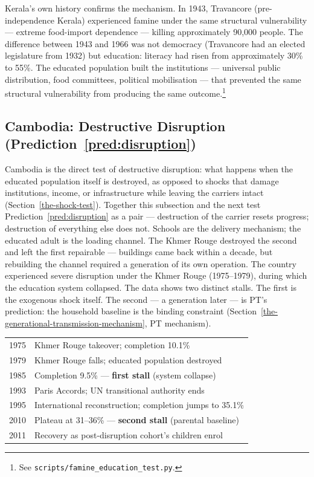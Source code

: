 \documentclass[12pt,letterpaper]{article}
\begin{document}
Kerala's own history confirms the mechanism. In 1943, Travancore (pre-independence Kerala) experienced famine under the same structural vulnerability --- extreme food-import dependence --- killing approximately 90,000 people. The difference between 1943 and 1966 was not democracy (Travancore had an elected legislature from 1932) but education: literacy had risen from approximately 30\% to 55\%. The educated population built the institutions --- universal public distribution, food committees, political mobilisation --- that prevented the same structural vulnerability from producing the same outcome.\footnote{See \texttt{scripts/famine\_education\_test.py}.}

\subsection{Cambodia: Destructive Disruption (Prediction~\ref{pred:disruption})}\label{cambodia-the-pt-shadow}

Cambodia is the direct test of destructive disruption: what happens
when the educated population itself is destroyed, as opposed to
shocks that damage institutions, income, or infrastructure while
leaving the carriers intact (Section~\ref{the-shock-test}). Together
this subsection and the next test
Prediction~\ref{pred:disruption} as a pair --- destruction of the
carrier resets progress; destruction of everything else does not. Schools are the
delivery mechanism; the educated adult is the loading channel. The
Khmer Rouge destroyed the second and left the first repairable ---
buildings came back within a decade, but rebuilding the channel
required a generation of its own operation. The country experienced
severe disruption under the Khmer Rouge (1975--1979), during which
the education system collapsed. The
data shows two distinct stalls. The first is the exogenous shock itself.
The second --- a generation later --- is PT's prediction: the
household baseline is the binding constraint (Section~\ref{the-generational-transmission-mechanism}, PT mechanism).

\begin{center}
\small
\begin{tabular}{@{}ll@{}}
\toprule
1975 & Khmer Rouge takeover; completion 10.1\% \\
1979 & Khmer Rouge falls; educated population destroyed \\
1985 & Completion 9.5\% --- \textbf{first stall} (system collapse) \\
1993 & Paris Accords; UN transitional authority ends \\
1995 & International reconstruction; completion jumps to 35.1\% \\
2010 & Plateau at 31--36\% --- \textbf{second stall} (parental baseline) \\
2011 & Recovery as post-disruption cohort's children enrol \\
\bottomrule
\end{tabular}
\end{center}
\end{document}
